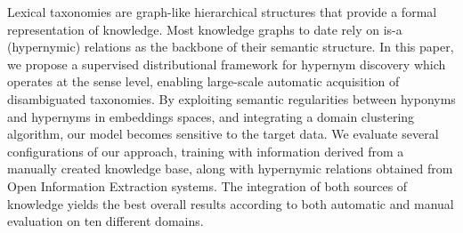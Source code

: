 Lexical taxonomies are graph-like hierarchical structures that provide a formal representation of knowledge. Most knowledge graphs to date rely on is-a (hypernymic) relations as the backbone of their semantic structure. In this paper, we propose a supervised distributional framework for hypernym discovery which operates at the sense level, enabling large-scale automatic acquisition of disambiguated taxonomies. By exploiting semantic regularities between hyponyms and hypernyms in embeddings spaces, and integrating a domain clustering algorithm, our model becomes sensitive to the target data. We evaluate several configurations of our approach, training with information derived from a manually created knowledge base, along with hypernymic relations obtained from Open Information Extraction systems. The integration of both sources of knowledge yields the best overall results according to both automatic and manual evaluation on ten different domains.
